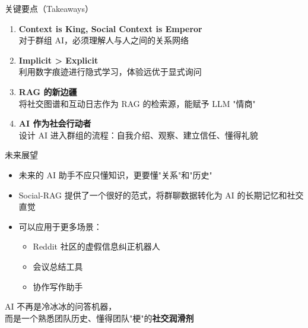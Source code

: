 \documentclass[UTF8,aspectratio=169]{ctexbeamer}
\begin{document}
\begin{frame}{关键要点（Takeaways）}
\begin{enumerate}
\item \textbf{Context is King, Social Context is Emperor} \\
  对于群组 AI，必须理解人与人之间的关系网络

\vspace{0.3cm}

\item \textbf{Implicit > Explicit} \\
  利用数字痕迹进行隐式学习，体验远优于显式询问

\vspace{0.3cm}

\item \textbf{RAG 的新边疆} \\
  将社交图谱和互动日志作为 RAG 的检索源，能赋予 LLM "情商"

\vspace{0.3cm}

\item \textbf{AI 作为社会行动者} \\
  设计 AI 进入群组的流程：自我介绍、观察、建立信任、懂得礼貌
\end{enumerate}
\end{frame}

\begin{frame}{未来展望}
\begin{itemize}
\item 未来的 AI 助手不应只懂知识，更要懂"关系"和"历史"
\item Social-RAG 提供了一个很好的范式，将群聊数据转化为 AI 的长期记忆和社交直觉
\item 可以应用于更多场景：
  \begin{itemize}
  \item Reddit 社区的虚假信息纠正机器人
  \item 会议总结工具
  \item 协作写作助手
  \end{itemize}
\end{itemize}

\vspace{0.5cm}

\begin{center}
\Large
\textcolor{myblue}{AI 不再是冷冰冰的问答机器，\\
而是一个熟悉团队历史、懂得团队"梗"的\textbf{社交润滑剂}}
\end{center}
\end{frame}
\end{document}
